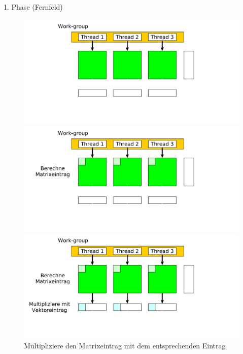 \documentclass[10pt]{beamer}
\begin{document}
\begin{frame}{1. Phase (Fernfeld)}
  \begin{figure}
    \begin{overprint}
        \centering
        \includegraphics[width=\linewidth]{figures/fg-ff-initial-situation.pdf}
        \caption{Ausgangssituation einer Opencl work-group in der 1. Phase.}
        \centering
        \includegraphics[width=\linewidth]{figures/fg-ff-compute-matrix-entry.pdf}
        \caption{Berechne den ersten Eintrag einer Matrixzeile.}
        \centering
        \includegraphics[width=\linewidth]{figures/fg-ff-multiply-vector.pdf}
        \caption{Multipliziere den Matrixeintrag mit dem entsprechenden Eintrag
}
\end{overprint}
\end{figure}
\end{frame}
\end{document}
